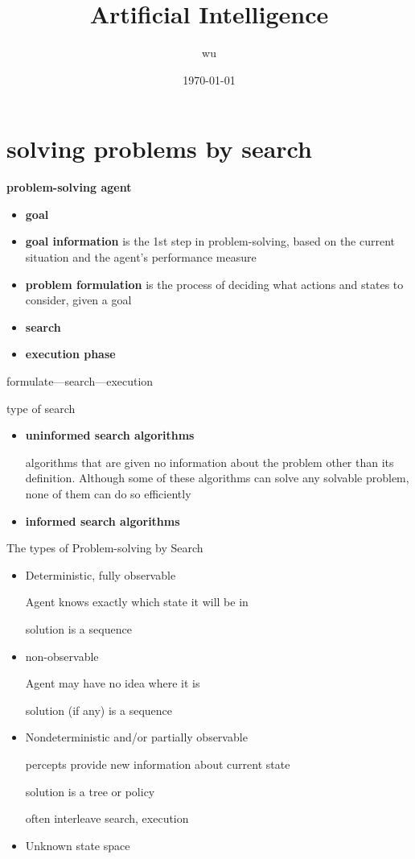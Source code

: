 \documentclass[11pt]{article}
\author{wu}
\date{\today}
\title{Artificial Intelligence}
\begin{document}
\maketitle
\tableofcontents

\section{solving problems by search}
\label{sec:org7b8ea8e}
\textbf{problem-solving agent}
\begin{itemize}
\item \textbf{goal}
\item \textbf{goal information} is the 1st step in problem-solving, based on the
current situation and the agent’s performance measure
\item \textbf{problem formulation} is the process of deciding what actions and
states to consider, given a goal
\item \textbf{search}
\item \textbf{execution phase}
\end{itemize}


formulate—search—execution


type of search
\begin{itemize}
\item \textbf{uninformed search algorithms}

algorithms that are given no information about the problem other
than its definition. Although some of these algorithms can solve
any solvable problem, none of them can do so efficiently
\item \textbf{informed search algorithms}
\end{itemize}


The types of Problem-solving by Search
\begin{itemize}
\item Deterministic, fully observable

Agent knows exactly which state it will be in

solution is a sequence
\item non-observable

Agent may have no idea where it is

solution (if any) is a sequence
\item Nondeterministic and/or partially observable

percepts provide new information about current state

solution is a tree or policy

often interleave search, execution
\item Unknown state space
\end{itemize}
\end{document}
